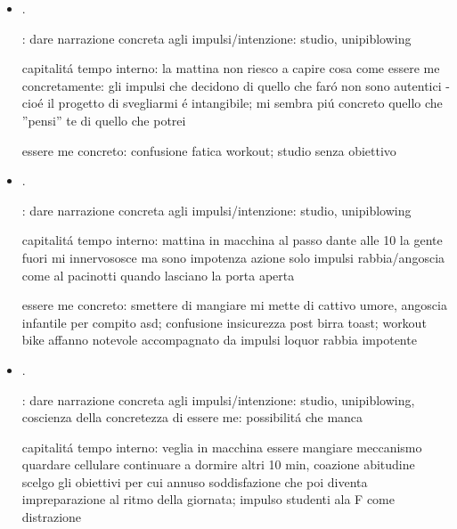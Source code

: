 \begin{itemize}
: dare narrazione concreta agli impulsi/intenzione: studio, unipiblowing

capitalit\'a tempo interno:  sone le 4 di mattina sono arrivato a passo dante non riesco pi\'u a pensare leggo solo qualche twitt: e la mattina non ricomincio a pensare per colpa del dolore di dovermi svegliare; contrasto coazioni pensiero; so che la rabbia \'e inutile ma senza rabbia mi addormento; essere me per problemi triviali

essere me concreto: agitazione mentre studio con altra gente/non mi concentro ''non ho voglia''

\item {}.

: dare narrazione concreta agli impulsi/intenzione: studio, unipiblowing

capitalit\'a tempo interno: la mattina non riesco a capire cosa come essere me concretamente: gli impulsi che decidono di quello che far\'o non sono autentici - cio\'e il progetto di svegliarmi \'e intangibile; mi sembra pi\'u concreto quello che ''pensi'' te di quello che potrei

essere me concreto: confusione fatica workout; studio senza obiettivo

\item {}.

: dare narrazione concreta agli impulsi/intenzione: studio, unipiblowing

capitalit\'a tempo interno: mattina in macchina al passo dante alle 10 la gente fuori mi innervososce ma sono impotenza azione solo impulsi rabbia/angoscia come al pacinotti quando lasciano la porta aperta

essere me concreto: smettere di mangiare mi mette di cattivo umore, angoscia infantile per compito asd; confusione insicurezza post birra toast; workout bike affanno notevole accompagnato da impulsi loquor rabbia impotente

\item {}.

: dare narrazione concreta agli impulsi/intenzione: studio, unipiblowing, coscienza della concretezza di essere me: possibilit\'a che manca

capitalit\'a tempo interno: veglia in macchina essere mangiare meccanismo quardare cellulare continuare a dormire altri 10 min, coazione abitudine scelgo gli obiettivi per cui annuso soddisfazione che poi diventa impreparazione al ritmo della giornata; impulso studenti ala F come distrazione


\end{itemize}
